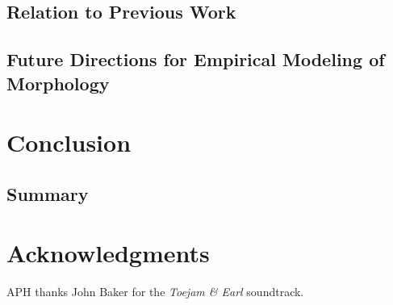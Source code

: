 \documentclass[usenatbib,usegraphicx,letterpaper]{mn2e}
\begin{document}
\subsection{Relation to Previous Work}
\label{subsec:previouswork}

\subsection{Future Directions for Empirical Modeling of Morphology}
\label{subsec:future}


\section{Conclusion}
\label{sec:conclusion}

\subsection{Summary}
\label{subsec:summary}

\section*{Acknowledgments}

APH thanks John Baker for the {\em Toejam \& Earl} soundtrack. 


\end{document}
